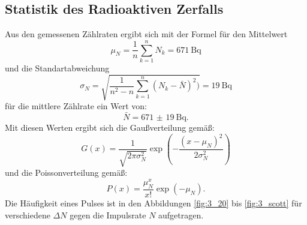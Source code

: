 \subsection{Statistik des Radioaktiven Zerfalls}

Aus den gemessenen Zählraten ergibt sich mit der Formel für den Mittelwert
\begin{equation*}
\mu_N= \frac{1}{n}\sum_{k=1}^n N_k = \SI{671}{\becquerel}
\end{equation*} 
und die Standartabweichung
\begin{equation*}
\sigma_N=\sqrt{\frac{1}{n^2-n}\sum_{k=1}^n (N_k-\bar{N})^2)} = \SI{19}{\becquerel}
\end{equation*} 
für die mittlere Zählrate ein Wert von:
\begin{equation*}
\bar{N}= \SI{671(19)}{\becquerel} \text{.}
\end{equation*} 
Mit diesen Werten ergibt sich die Gaußverteilung gemäß:
\begin{equation*}
G(x) = \frac{1}{\sqrt{2\pi\sigma_N^2}}\exp{\left(-\frac{(x-\mu_N)^2}{2\sigma_N^2}\right)}
\end{equation*} 
und die Poissonverteilung gemäß:
\begin{equation*}
P(x) = \frac{\mu_N^x}{x!}\exp{\left(-\mu_N\right)}\text{.}
\end{equation*} 
Die Häufigkeit eines Pulses ist in den Abbildungen \ref{fig:3_20} bis \ref{fig:3_scott} für verschiedene $\Delta N$ gegen die Impulsrate $N$ aufgetragen. 

